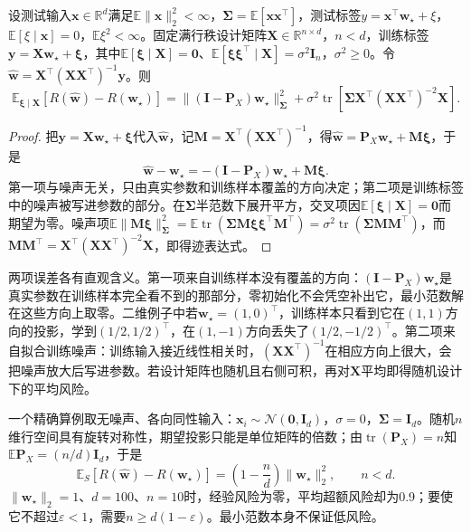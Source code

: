 \begin{theorem}[基于最小范数的回归期望风险]
\label{thm:minimum-norm-risk-decomposition}
设测试输入$\bm x\in\mathbb R^d$满足$\mathbb E\|\bm x\|_2^2<\infty$，$\bm\Sigma=\mathbb E[\bm x\bm x^\top]$，测试标签$y=\bm x^\top\bm w_\star+\xi$，$\mathbb E[\xi\mid\bm x]=0$，$\mathbb E\xi^2<\infty$。固定满行秩设计矩阵$\bm X\in\mathbb R^{n\times d}$，$n<d$，训练标签$\bm y=\bm X\bm w_\star+\bm\xi$，其中$\mathbb E[\bm\xi\mid\bm X]=\bm 0$、$\mathbb E[\bm\xi\bm\xi^\top\mid\bm X]=\sigma^2\bm I_n$，$\sigma^2\geq0$。令$\widehat{\bm w}=\bm X^\top(\bm X\bm X^\top)^{-1}\bm y$。则
\begin{equation}
 \mathbb E_{\bm\xi\mid\bm X}[R(\widehat{\bm w})-R(\bm w_\star)]
 =\|(\bm I-\bm P_X)\bm w_\star\|_{\bm\Sigma}^2
 +\sigma^2\operatorname{tr}\left[\bm\Sigma\bm X^\top(\bm X\bm X^\top)^{-2}\bm X\right].
 \label{eq:minimum-norm-prediction-risk}
\end{equation}
\end{theorem}
\begin{proof}
把$\bm y=\bm X\bm w_\star+\bm\xi$代入$\widehat{\bm w}$，记$\bm M=\bm X^\top(\bm X\bm X^\top)^{-1}$，得$\widehat{\bm w}=\bm P_X\bm w_\star+\bm M\bm\xi$，于是
\[
 \widehat{\bm w}-\bm w_\star=-(\bm I-\bm P_X)\bm w_\star+\bm M\bm\xi.
\]
第一项与噪声无关，只由真实参数和训练样本覆盖的方向决定；第二项是训练标签中的噪声被写进参数的部分。在$\bm\Sigma$半范数下展开平方，交叉项因$\mathbb E[\bm\xi\mid\bm X]=\bm 0$而期望为零。噪声项$\mathbb E\|\bm M\bm\xi\|_{\bm\Sigma}^2=\mathbb E\operatorname{tr}(\bm\Sigma\bm M\bm\xi\bm\xi^\top\bm M^\top)=\sigma^2\operatorname{tr}(\bm\Sigma\bm M\bm M^\top)$，而$\bm M\bm M^\top=\bm X^\top(\bm X\bm X^\top)^{-2}\bm X$，即得迹表达式。
\end{proof}

两项误差各有直观含义。第一项来自训练样本没有覆盖的方向：$(\bm I-\bm P_X)\bm w_\star$是真实参数在训练样本完全看不到的那部分，零初始化不会凭空补出它，最小范数解在这些方向上取零。二维例子中若$\bm w_\star=(1,0)^\top$，训练样本只看到它在$(1,1)$方向的投影，学到$(1/2,1/2)^\top$，在$(1,-1)$方向丢失了$(1/2,-1/2)^\top$。第二项来自拟合训练噪声：训练输入接近线性相关时，$(\bm X\bm X^\top)^{-1}$在相应方向上很大，会把噪声放大后写进参数。若设计矩阵也随机且右侧可积，再对$\bm X$平均即得随机设计下的平均风险。

一个精确算例取无噪声、各向同性输入：$\bm x_i\sim\mathcal N(\bm 0,\bm I_d)$，$\sigma=0$，$\bm\Sigma=\bm I_d$。随机$n$维行空间具有旋转对称性，期望投影只能是单位矩阵的倍数；由$\operatorname{tr}(\bm P_X)=n$知$\mathbb E\bm P_X=(n/d)\bm I_d$，于是
\begin{equation}
 \mathbb E_S[R(\widehat{\bm w})-R(\bm w_\star)]
 =\left(1-\frac nd\right)\|\bm w_\star\|_2^2,
 \qquad n<d.
 \label{eq:isotropic-minimum-norm-risk}
\end{equation}
$\|\bm w_\star\|_2=1$、$d=100$、$n=10$时，经验风险为零，平均超额风险却为0.9；要使它不超过$\varepsilon<1$，需要$n\geq d(1-\varepsilon)$。最小范数本身不保证低风险。

